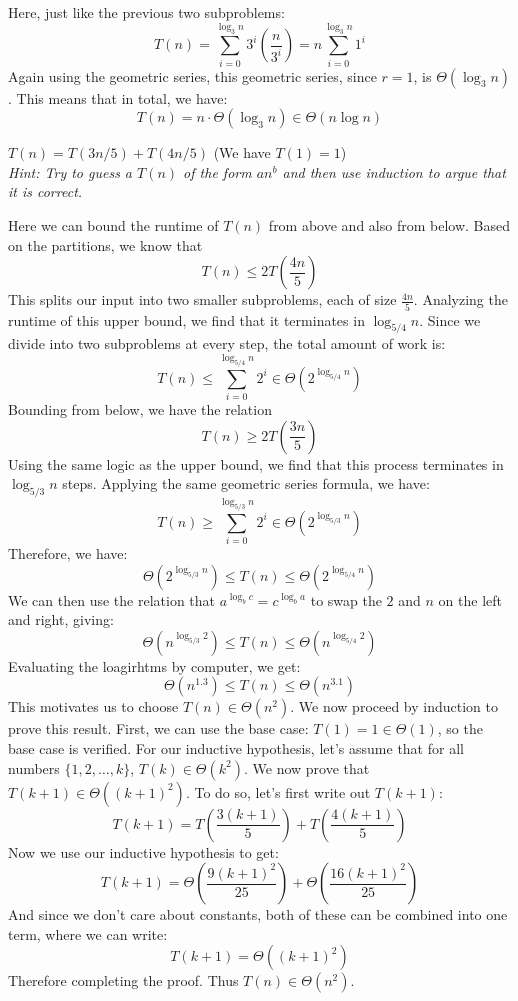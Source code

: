 \documentclass[11pt]{article}
\begin{document}
\begin{subparts}
\begin{solution}
	Here, just like the previous two subproblems:
	\[
		T(n) = \sum_{i = 0}^{\log_3n} 3^i \left( \frac{n}{3^i} \right) = n \sum_{i = 0}^{\log_3n} 1^i
	\] 
	Again using the geometric series, this geometric series, since $r = 1$, is $\Theta(\log_3n)$. This 
	means that in total, we have:
	\[
	T(n) = n \cdot \Theta(\log_3n) \in \Theta(n \log n) 
	\] 
\end{solution}
\subpart \(T(n) = T(3n/5)+T(4n/5)\) (We have $T(1) = 1$)\\
\textit{Hint: Try to guess a $T(n)$ of the form $an^b$ and then use induction to argue that it is correct.}

	\begin{solution}
	Here we can bound the runtime of $T(n)$ from above and also from below. Based on the partitions, we 
	know that 
	\[
	T(n) \le 2T\left( \frac{4n}{5} \right) 
	\] 
	This splits our input into two smaller subproblems, each of size $\frac{4n}{5}$. Analyzing the runtime of 
	this upper bound, we find that it terminates in $\log_{5 / 4} n$. Since we divide into two subproblems
	at every step, the total amount of work is:
	\[
		T(n) \le  \sum_{i = 0}^{\log_{5 / 4} n} 2^i \in \Theta\left(2^{\log_{5 / 4} n}\right)
	\] 
	Bounding from below, we have the relation
	\[
	T(n) \ge 2T\left( \frac{3n}{5} \right) 
	\] 
	Using the same logic as the upper bound, we find that this process terminates in $\log_{5 / 3} n$ steps. 
	Applying the same geometric series formula, we have:
	\[
		T(n) \ge \sum_{i = 0}^{\log_{5 / 3} n} 2^i \in \Theta\left( 2^{\log_{5 / 3} n} \right) 
	\] 
	Therefore, we have:
	\[
		\Theta\left( 2^{\log_{5 / 3} n }\right) \le T(n) \le \Theta\left( 2^{\log_{5 / 4} n} \right) 
	\] 
	We can then use the relation that $a^{\log_b c} = c^{\log_b a}$ to swap the $2$ and $n$ on the left
	and right, giving:
	\[
		\Theta\left(n^{\log_{5 / 3} 2}\right) \le T(n) \le \Theta\left( n^{\log_{5 / 4} 2} \right) 
	\] 
	Evaluating the loagirhtms by computer, we get:
	\[
		\Theta\left(n^{1.3}\right) \le T(n) \le \Theta\left( n^{3.1} \right) 
	\] 
	This motivates us to choose $T(n) \in \Theta(n^2)$. We now proceed by induction to prove this result. First, 
	we can use the base case: $T(1) = 1 \in \Theta(1)$, so the base case is verified. For our inductive 
	hypothesis, let's assume that for all numbers $\{1, 2, \dots, k\}$, $T(k) \in \Theta(k^2)$. We now prove that
	$T(k+1) \in \Theta((k+1)^2)$.
	To do so, let's first write out $T(k+1)$:
	\[
		T(k+1) = T\left( \frac{3(k+1)}{5} \right)  + T\left( \frac{4(k+1)}{5} \right) 
	\]
	Now we use our inductive hypothesis to get:
	\[
	T(k+1) = \Theta\left( \frac{9(k+1)^2}{25} \right) + \Theta\left( \frac{16(k+1)^2}{25} \right) 
	\] 
	And since we don't care about constants, both of these can be combined into one term, where we can write:
	\[
	T(k+1) = \Theta((k+1)^2)
	\] 
	Therefore completing the proof. Thus $T(n) \in \Theta(n^2)$.
	\end{solution}
\end{subparts}
\end{document}
